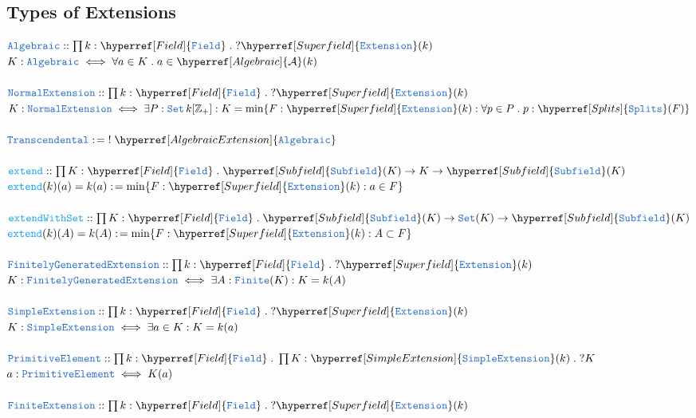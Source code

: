 \documentclass[12pt]{article}
\newcommand{\TYPE}[1]{\textcolor{NavyBlue}{\mathtt{#1}}}
\newcommand{\FUNC}[1]{\textcolor{Cerulean}{\mathtt{#1}}}
\renewcommand{\.}{\; . \;}
\newcommand{\de}{: \kern 0.1pc =}
\newcommand{\IsNot}{\; ! \;}
\newcommand{\NNInt}{\mathbb{Z}_{+} }
\newcommand{\Set}{\TYPE{Set}}
\newcommand{\Field}{\hyperref[Field]{\TYPE{Field}}}
\newcommand{\Superfield}{\hyperref[Superfield]{\TYPE{Extension}}}
\newcommand{\Subfield}{\hyperref[Subfield]{\TYPE{Subfield}}}
\newcommand{\Splits}{\hyperref[Splits]{\TYPE{Splits}}}
\newcommand{\Al}{\hyperref[Algebraic]{\mathcal{A}}}
\newcommand{\Algebraic}{\hyperref[AlgebraicExtension]{\TYPE{Algebraic}}}
\newcommand{\SE}{\hyperref[SimpleExtension]{\TYPE{SimpleExtension}}}
\begin{document}
   \subsection{Types of Extensions}
   $\TYPE{Algebraic} :: \prod k : \Field \. ? \Superfield(k) $ \\
   $ K : \TYPE{Algebraic} \iff \forall a \in K \. a \in \Al(k) $
   \label{AlgebraicExtension} 
   \\ \\
    $\TYPE{NormalExtension} :: \prod k : \Field \. ? \Superfield(k) $ \\
   $ K : \TYPE{NormalExtension} \iff \exists P : \Set \, k[\NNInt] : K = 
   \min\{F : \Superfield(k) : \forall p \in P \. p : \Splits(F)\}$
   \label{NormalExtension} 
   \\ \\
   $\TYPE{Transcendental} \de \IsNot \Algebraic$
   \label{TranscedentalExtension}    
   \\ \\
   $\FUNC{extend} :: \prod K : \Field \. \Subfield(K) \to K \to \Subfield(K)$\\
   $ \FUNC{extend}(k)(a) = k(a) \de \min\{ F : \Superfield(k) : a \in F \}$
   \\ \\
   $\FUNC{extendWithSet} :: \prod K : \Field \. \Subfield(K) \to \Set(K) \to \Subfield(K)$       \\
   $ \FUNC{extend}(k)(A) = k(A) \de \min\{ F : \Superfield(k) : A \subset F \}$
   \\ \\
   $\TYPE{FinitelyGeneratedExtension} :: \prod k : \Field \. ? \Superfield(k) $ \\
   $ K : \TYPE{FinitelyGeneratedExtension} \iff \exists  A : \TYPE{Finite}(K) : K = k(A) $
   \label{FGE}
   \\ \\
   $\TYPE{SimpleExtension} :: \prod k : \Field \. ? \Superfield(k) $ \\
   $ K : \TYPE{SimpleExtension} \iff \exists  a \in K : K = k(a) $ 
   \label{SimpleExtension}
   \\ \\
   $ \TYPE{PrimitiveElement} :: \prod k : \Field \. \prod K  : \SE (k) \. ?K  $ \\
   $   a  :  \TYPE{PrimitiveElement}  \iff  K(a) $
   \\ \\
   $\TYPE{FiniteExtension} :: \prod k : \Field \. ? \Superfield(k) $ \\
\end{document}
